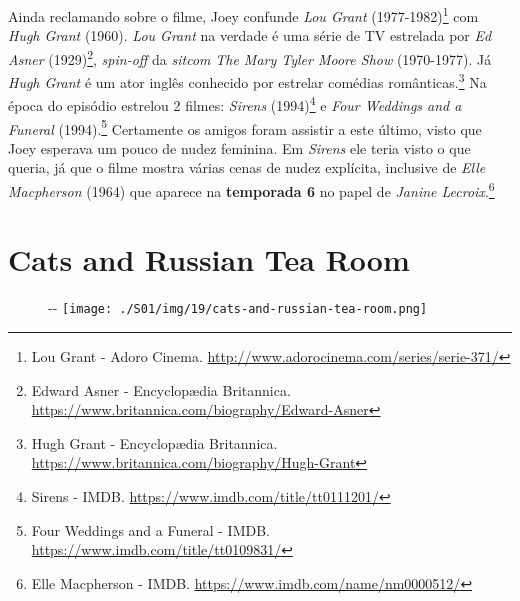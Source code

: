 Ainda reclamando sobre o filme, Joey confunde \emph{Lou Grant}
(1977-1982)\footnote{\sloppy Lou Grant - Adoro Cinema. \url{http://www.adorocinema.com/series/serie-371/}}
com \emph{Hugh Grant} (1960). \emph{Lou Grant} na verdade é uma série de
TV estrelada por \emph{Ed Asner} (1929)\footnote{\sloppy Edward Asner - Encyclopædia Britannica. \url{https://www.britannica.com/biography/Edward-Asner}},
\emph{spin-off} da \emph{sitcom} \emph{The Mary Tyler Moore Show}
(1970-1977). Já \emph{Hugh Grant} é um ator inglês conhecido por
estrelar comédias românticas.\footnote{\sloppy Hugh Grant - Encyclopædia Britannica. \url{https://www.britannica.com/biography/Hugh-Grant}}
Na época do episódio estrelou 2 filmes: \emph{Sirens} (1994)\footnote{\sloppy Sirens - IMDB. \url{https://www.imdb.com/title/tt0111201/}}
e \emph{Four Weddings and a Funeral} (1994).\footnote{\sloppy Four Weddings and a Funeral - IMDB. \url{https://www.imdb.com/title/tt0109831/}}
Certamente os amigos foram assistir a este último, visto que Joey
esperava um pouco de nudez feminina. Em \emph{Sirens} ele teria visto o
que queria, já que o filme mostra várias cenas de nudez explícita,
inclusive de \emph{Elle Macpherson} (1964) que aparece na
\textbf{\textcolor{primarycolor}{temporada 6}} no papel de \emph{Janine
Lecroix}.\footnote{\sloppy Elle Macpherson - IMDB. \url{https://www.imdb.com/name/nm0000512/}}

\hypertarget{cats-and-russian-tea-room}{%
\section{Cats and Russian Tea Room}\label{cats-and-russian-tea-room}}

\begin{figure}[!ht]
  \begin{adjustwidth}{-\oddsidemargin-1in}{-\rightmargin}
    \centering
    \texttt{[image: ./S01/img/19/cats-and-russian-tea-room.png]}
  \end{adjustwidth}
\end{figure}

